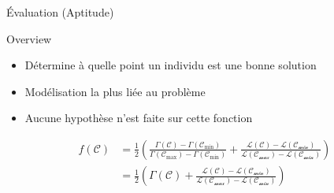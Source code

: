 
\begin{frame}{Évaluation (Aptitude)}


  \begin{block}{Overview}
    \begin{itemize}
      \item Détermine à quelle point un individu est une bonne solution
      \item Modélisation la plus liée au problème
      \item Aucune hypothèse n'est faite sur cette fonction
    \end{itemize}
  \end{block}

  \begin{align}
    f(\mathcal{C}) &= \frac{1}{2} \left(
      \frac{\Gamma(\mathcal{C}) - \Gamma(\mathcal{C}_{\textrm{min}})}
      {\Gamma(\mathcal{C}_{\textrm{max}}) - \Gamma(\mathcal{C}_{\textrm{min}})}
      +
      \frac{\mathcal{L(C)} - \mathcal{L(C_{\textrm{min}})}}
      {\mathcal{L(C_{\textrm{max}})} - \mathcal{L(C_{\textrm{min}})}}\right)\\
                   &= \frac{1}{2} \left(\Gamma(\mathcal{C})
        +\frac{\mathcal{L(C)} - \mathcal{L(C_{\textrm{min}})}}
        {\mathcal{L(C_{\textrm{max}})} - \mathcal{L(C_{\textrm{min}})}}\right)
  \end{align}
\end{frame}

